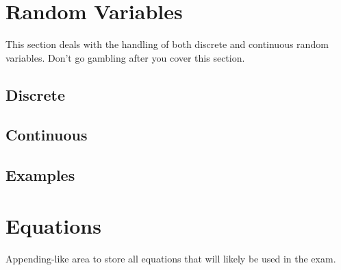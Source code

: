 \section{Random Variables}
This section deals with the handling of both discrete and continuous random variables. Don't go gambling after you cover this section.
\subsection{Discrete}
\subsection{Continuous}
\subsection{Examples}
\newpage
\section{Equations}
Appending-like area to store all equations that will likely be used in the exam.
